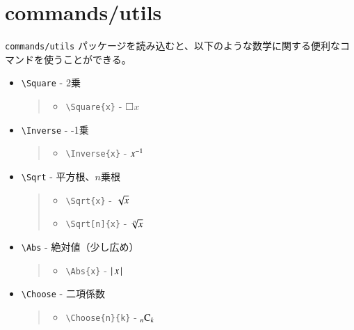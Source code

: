 \documentclass[oneside,10pt,a4paper]{jsarticle}
\begin{document}
  \section{commands/utils}

  \verb|commands/utils| パッケージを読み込むと、以下のような数学に関する便利なコマンドを使うことができる。

  \begin{itemize}
    \item \verb|\Square| - 2乗
      \begin{quote}
        \Example
        \begin{itemize}
          \item \verb|\Square{x}| - $\Square{x}$
        \end{itemize}
      \end{quote}
    \item \verb|\Inverse| - -1乗
      \begin{quote}
        \Example
        \begin{itemize}
          \item \verb|\Inverse{x}| - ${x}^{-1}$
        \end{itemize}
      \end{quote}
    \item \verb|\Sqrt| - 平方根、$n$乗根
      \begin{quote}
        \Example
        \begin{itemize}
          \item \verb|\Sqrt{x}| - $\Sqrt{x}$
          \item \verb|\Sqrt[n]{x}| - $\Sqrt[n]{x}$
        \end{itemize}
      \end{quote}
    \item \verb|\Abs| - 絶対値（少し広め）
      \begin{quote}
        \Example
        \begin{itemize}
          \item \verb|\Abs{x}| - $\left| \, x \, \right|$
        \end{itemize}
      \end{quote}
    \item \verb|\Choose| - 二項係数
      \begin{quote}
        \Example
        \begin{itemize}
          \item \verb|\Choose{n}{k}| - ${}_{n} \mathrm{C}_{k}$
        \end{itemize}

\end{quote}
\end{itemize}
\end{document}
